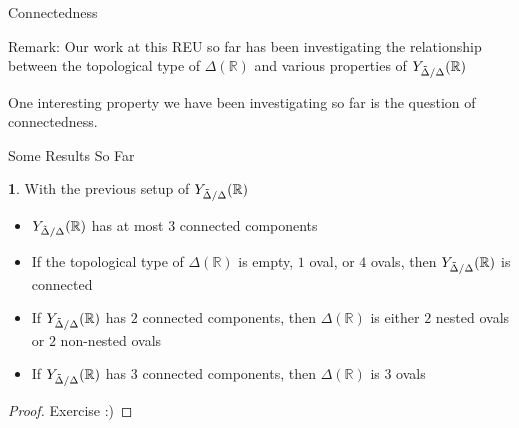 \documentclass[hyperref, notheorems]{beamer}
\newcommand{\Rbb}{\mathbb{R}}
\newcommand{\Pbb}{\mathbb{P}}
\newcommand{\Ydd}{Y_{\Tilde{\Delta} /\Delta}}
\theoremstyle{definition}
\newtheorem{definition}{\translate{Definition}}
\newtheorem{theorem}{\translate{Theorem}}
\begin{document}
\begin{frame}{Connectedness}
\begin{block}{Remark:}
    Our work at this REU so far has been investigating the relationship between the topological type of $\Delta(\Rbb)$ and various properties of $\Ydd(\Rbb)$
\end{block}

One interesting property we have been investigating so far is the question of connectedness.



\end{frame}

\begin{frame}{Some Results So Far}
    
    \begin{theorem}
    With the previous setup of $\Ydd(\Rbb)$
    \begin{itemize}
        \item $\Ydd(\Rbb)$ has at most $3$ connected components
        \item If the topological type of $\Delta(\Rbb)$ is empty, $1$ oval, or $4$ ovals, then $\Ydd(\Rbb)$ is connected
        \item If $\Ydd(\Rbb)$ has $2$ connected components, then $\Delta(\Rbb)$ is either $2$ nested ovals or $2$ non-nested ovals
        \item If $\Ydd(\Rbb)$ has $3$ connected components, then $\Delta(\Rbb)$ is $3$ ovals
    \end{itemize}
    \end{theorem}
    
    \begin{proof}
     Exercise :)
    \end{proof}

\end{frame}

\end{document}
